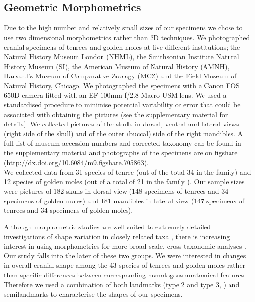 \documentclass[12pt,a4paper]{article}
\begin{document}
\subsection{Geometric Morphometrics}

Due to the high number and relatively small sizes of our specimens we chose to use two dimensional morphometrics rather than 3D techniques. We photographed cranial specimens of tenrecs and golden moles at five different institutions; the Natural History Museum London (NHML), the Smithsonian Institute Natural History Museum (SI), the American Museum of Natural History (AMNH), Harvard's Museum of Comparative Zoology (MCZ) and the Field Museum of Natural History, Chicago. We photographed the specimens with a Canon EOS 650D camera fitted with an EF 100mm f/2.8 Macro USM lens. We used a standardised procedure to minimise potential variability or error that could be associated with obtaining the pictures (see the supplementary material for details).
We collected pictures of the skulls in dorsal, ventral and lateral views (right side of the skull) and of the outer (buccal) side of the right mandibles. A full list of museum accession numbers and corrected taxonomy can be found in the supplementary material and photographs of the specimens are on figshare (http://dx.doi.org/10.6084/m9.figshare.705863).\\

We collected data from 31 species of tenrec (out of the total 34 in the family) and 12 species of golden moles (out of a total of 21 in the family \citep{Asher2010}). Our sample sizes were pictures of 182 skulls in dorsal view (148 specimens of tenrecs and 34 specimens of golden moles) and 181 mandibles in lateral view (147 specimens of tenrecs and 34 specimens of golden moles).
	
Although morphometric studies are well suited to extremely detailed investigations of shape variation in closely related taxa \citep[e.g.][]{Cardini2003, Panchetti2008, Blagojevic2011}, there is increasing interest in using morphometrics for more broad scale, cross-taxonomic analyses \citep{Wroe2007, Klingenberg2013}. Our study falls into the later of these two groups. We were interested in changes in overall cranial shape among the 43 species of tenrecs and golden moles rather than specific differences between corresponding homologous anatomical features. Therefore we used a combination of both landmarks (type 2 and type 3, \citep{Zelditch2012}) and semilandmarks to characterise the shapes of our specimens.
\end{document}
